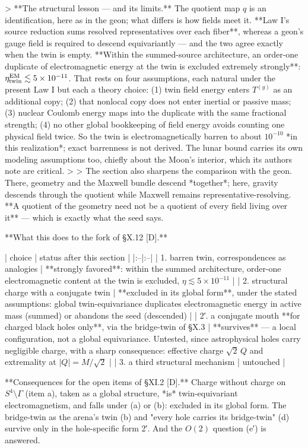 > **The structural lesson — and its limits.** The quotient map $q$ is an identification, here as in the geon; what differs is how fields meet it. **Law I's source reduction sums resolved representatives over each fiber**, whereas a geon's gauge field is required to descend equivariantly — and the two agree exactly when the twin is empty. **Within the summed-source architecture, an order-one duplicate of electromagnetic energy at the twin is excluded extremely strongly**: $\eta^{\rm EM}_{\rm twin}\lesssim5\times10^{-11}$. That rests on four assumptions, each natural under the present Law I but each a theory choice: (1) twin field energy enters $T^{(g)}$ as an additional copy; (2) that nonlocal copy does not enter inertial or passive mass; (3) nuclear Coulomb energy maps into the duplicate with the same fractional strength; (4) no other global bookkeeping of field energy avoids counting one physical field twice. So the twin is electromagnetically barren to about $10^{-10}$ *in this realization*; exact barrenness is not derived. The lunar bound carries its own modeling assumptions too, chiefly about the Moon's interior, which its authors note are critical.
>
> The section also sharpens the comparison with the geon. There, geometry and the Maxwell bundle descend *together*; here, gravity descends through the quotient while Maxwell remains representative-resolving. **A quotient of the geometry need not be a quotient of every field living over it** — which is exactly what the seed says.

**What this does to the fork of §X.12 [D].**

| choice | status after this section |
|:--|:--|
| 1. barren twin, correspondences as analogies | **strongly favored**: within the summed architecture, order-one electromagnetic content at the twin is excluded, $\eta\lesssim5\times10^{-11}$ |
| 2. structural charge with a conjugate twin | **excluded in its global form**, under the stated assumptions: global twin-equivariance duplicates electromagnetic energy in active mass (summed) or abandons the seed (descended) |
| 2′. a conjugate mouth **for charged black holes only**, via the bridge-twin of §X.3 | **survives** — a local configuration, not a global equivariance. Untested, since astrophysical holes carry negligible charge, with a sharp consequence: effective charge $\sqrt2\,Q$ and extremality at $\lvert Q\rvert = M/\sqrt2$ |
| 3. a third structural mechanism | untouched |

**Consequences for the open items of §XI.2 [D].** Charge without charge on $S^4\setminus\Gamma$ (item a), taken as a global structure, *is* twin-equivariant electromagnetism, and falls under (a) or (b): excluded in its global form. The bridge-twin as the arena's twin (b) and "every hole carries its bridge-twin" (d) survive only in the hole-specific form 2′. And the $O(2)$ question (e′) is answered.

